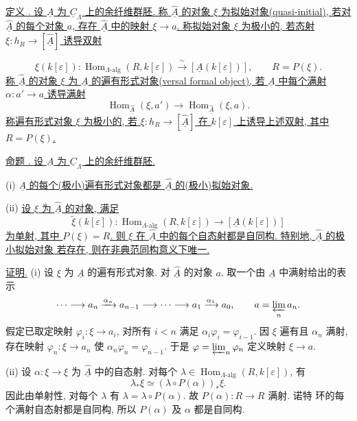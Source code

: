 \underline{定义 .
设 $\underline A$ 为 $\underline C_\Lambda$ 上的余纤维群胚.
称 $\widehat{\underline A}$ 的对象 $\xi$ 为拟始对象(quasi-initial),
若对 $\widehat{\underline A}$ 的每个对象 $a$, 存在 $\widehat{\underline A}$ 中的映射 $\xi\to a$.
称拟始对象 $\xi$ 为极小的, 若态射
$\xi:h_R\longrightarrow[\widehat{\underline A}]$ 诱导双射}


\[
 \xi(k[\varepsilon]):
 \operatorname{Hom}_{\Lambda\text{-alg}}(R,k[\varepsilon])
 \xrightarrow{\ \sim\ }
 [\underline A(k[\varepsilon])],
 \qquad R=P(\xi).
\]
\underline{称 $\widehat{\underline A}$ 的对象 $\xi$ 为 $\underline A$
的遍有形式对象(versal formal object), 若 $\underline A$ 中每个满射
$\alpha:a'\to a$ 诱导满射}
\[
 \operatorname{Hom}_{\widehat{\underline A}}(\xi,a')
 \longrightarrow
 \operatorname{Hom}_{\widehat{\underline A}}(\xi,a).
\]
\underline{称遍有形式对象 $\xi$ 为极小的, 若
$\xi:h_R\longrightarrow[\widehat{\underline A}]$ 在 $k[\varepsilon]$
上诱导上述双射, 其中 $R=P(\xi)$.}

\underline{命题 .
设 $\underline A$ 为 $\underline C_\Lambda$ 上的余纤维群胚.}

(i) \underline{$\underline A$ 的每个(极小)遍有形式对象都是
$\widehat{\underline A}$ 的(极小)拟始对象.}

(ii) \underline{设 $\xi$ 为 $\widehat{\underline A}$ 的对象, 满足}
\[
 \widetilde\xi(k[\varepsilon]):
 \operatorname{Hom}_{\Lambda\text{-alg}}(R,k[\varepsilon])
 \longrightarrow[\underline A(k[\varepsilon])]
\]
\underline{为单射, 其中 $P(\xi)=R$. 则 $\xi$ 在 $\widehat{\underline A}$
中的每个自态射都是自同构. 特别地, $\widehat{\underline A}$ 的极小拟始对象
若存在, 则在非典范同构意义下唯一.}

\underline{证明.} (i) 设 $\xi$ 为 $\underline A$ 的遍有形式对象.
对 $\widehat{\underline A}$ 的对象 $a$, 取一个由 $\underline A$ 中满射给出的表示
\[
 \cdots\longrightarrow a_n\xrightarrow{\alpha_n}a_{n-1}
 \longrightarrow\cdots\longrightarrow
 a_1\xrightarrow{\alpha_1}a_0,
 \qquad a=\varprojlim_n a_n.
\]
假定已取定映射 $\varphi_i:\xi\longrightarrow a_i$, 对所有 $i<n$ 满足
$\alpha_i\varphi_i=\varphi_{i-1}$. 因 $\xi$ 遍有且 $\alpha_n$ 满射,
存在映射 $\varphi_n:\xi\longrightarrow a_n$ 使 $\alpha_n\varphi_n=\varphi_{n-1}$.
于是 $\varphi=\varprojlim_n\varphi_n$ 定义映射 $\xi\longrightarrow a$.

(ii) 设 $\alpha:\xi\longrightarrow\xi$ 为 $\widehat{\underline A}$ 中的自态射.
对每个 $\lambda\in\operatorname{Hom}_{\Lambda\text{-alg}}(R,k[\varepsilon])$, 有
\[
 \lambda_*\xi\simeq
 (\lambda\circ P(\alpha))_*\xi.
\]
因此由单射性, 对每个 $\lambda$ 有 $\lambda=\lambda\circ P(\alpha)$.
故 $P(\alpha):R\longrightarrow R$ 满射.
诺特 环的每个满射自态射都是自同构,
所以 $P(\alpha)$ 及 $\alpha$ 都是自同构.


